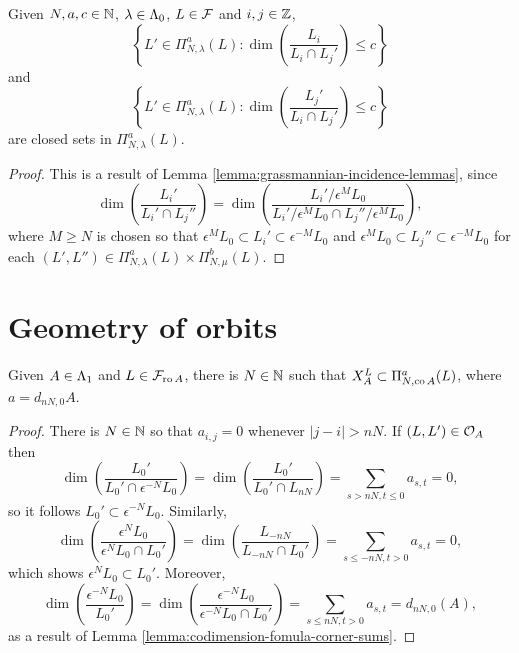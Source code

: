 \documentclass[a4paper, 11pt]{report}
\begin{document}
\begin{lemma}\label{lemma:incidence-varieties-consequences}
Given $N,a,c\in\naturals$, $\lambda\in\compositions$, $L\in\flags$ and $i,j\in\integers$,
\begin{equation*}
\left\{L'\in\Pi_{N,\lambda}^a(L):\dim\left(\frac{L_i}{L_i\cap L_j'}\right)\le c\right\}
\end{equation*}
and
\begin{equation*}
\left\{L'\in\Pi_{N,\lambda}^a(L): \dim\left(\frac{L_j'}{L_i\cap L_j'}\right)\le c\right\}
\end{equation*}
are closed sets in $\Pi_{N,\lambda}^a(L)$.
\end{lemma}

\begin{proof}
This is a result of Lemma \ref{lemma:grassmannian-incidence-lemmas}, since
\begin{equation*}
\dim\left(\frac{L_i'}{L_i'\cap L_j''}\right) = \dim\left(\frac{L_i'/{\epsilon^M L_0}}{L_i'/{\epsilon^M L_0}\cap L_j''/{\epsilon^M L_0}}\right),
\end{equation*}
where $M\geq N$ is chosen so that $\epsilon^M L_0\subset L_i'\subset\epsilon^{-M}L_0$ and $\epsilon^M L_0\subset L_j''\subset\epsilon^{-M}L_0$ for each $(L',L'')\in\Pi_{N,\lambda}^a(L)\times\Pi_{N,\mu}^b(L)$.
\end{proof}


\section{Geometry of orbits}

\begin{lemma}\label{lemma:bounded-orbits}
Given $A\in\matrices$ and $L\in\flags_{\ro{A}}$, there is $N\in\naturals$ such that $\xprod[L]{A}\subset\Pi_{N,\co{A}}^{a}(L)$, where $a=d_{nN,0}{A}$.
\end{lemma}

\begin{proof}
There is $N\in\naturals$ so that $a_{i,j}=0$ whenever $|j-i|>nN$. If $(L,L')\in\orbit{A}$ then
\begin{equation*}
\dim\left(\frac{L_0'}{L_0'\cap\epsilon^{-N}L_0}\right) = \dim\left(\frac{L_0'}{L_0'\cap L_{nN}}\right) = \sum_{s>nN,t\le 0} a_{s,t} = 0,
\end{equation*}
so it follows $L_0'\subset\epsilon^{-N}L_0$. Similarly,
\begin{equation*}
\dim\left(\frac{\epsilon^N L_0}{\epsilon^N L_0\cap L_0'}\right) = \dim\left(\frac{L_{-nN}}{L_{-nN}\cap L_0'}\right) = \sum_{s\le -nN,t>0} a_{s,t} = 0,
\end{equation*}
which shows $\epsilon^N L_0\subset L_0'$. Moreover,
\begin{equation*}
\dim\left(\frac{\epsilon^{-N}L_0}{L_0'}\right) = \dim\left(\frac{\epsilon^{-N}L_0}{\epsilon^{-N}L_0\cap L_0'}\right) = \sum_{s\le nN,t>0}a_{s,t} = d_{nN,0}(A),
\end{equation*}
as a result of Lemma \ref{lemma:codimension-fomula-corner-sums}. 
\end{proof}
\end{document}
